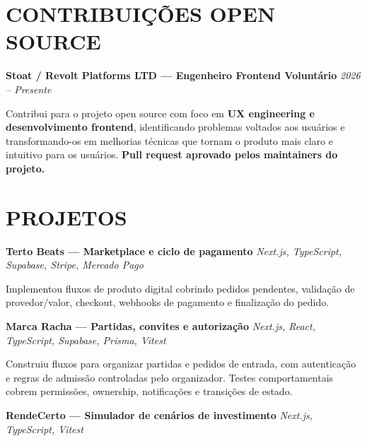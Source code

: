 \documentclass[10pt,a4paper]{article}
\begin{document}

\section*{CONTRIBUIÇÕES OPEN SOURCE}

\noindent
\textbf{Stoat / Revolt Platforms LTD — Engenheiro Frontend Voluntário}
\hfill
\textit{2026 -- Presente}

\footnotesize

Contribui para o projeto open source com foco em
\textbf{UX engineering e desenvolvimento frontend}, identificando
problemas voltados aos usuários e transformando-os em melhorias
técnicas que tornam o produto mais claro e intuitivo para os
usuários.
\textbf{Pull request aprovado pelos maintainers do projeto.}


\section*{PROJETOS}

\noindent
\textbf{Terto Beats — Marketplace e ciclo de pagamento}
\hfill
\textit{Next.js, TypeScript, Supabase, Stripe, Mercado Pago}

\footnotesize

Implementou fluxos de produto digital cobrindo pedidos pendentes, validação de provedor/valor, checkout, webhooks de pagamento e finalização do pedido.

\vspace{0.5pt}

\noindent
\textbf{Marca Racha — Partidas, convites e autorização}
\hfill
\textit{Next.js, React, TypeScript, Supabase, Prisma, Vitest}

\footnotesize

Construiu fluxos para organizar partidas e pedidos de entrada, com autenticação e regras de admissão controladas pelo organizador. Testes comportamentais cobrem permissões, ownership, notificações e transições de estado.

\vspace{0.5pt}

\noindent
\textbf{RendeCerto — Simulador de cenários de investimento}
\hfill
\textit{Next.js, TypeScript, Vitest}
\end{document}
